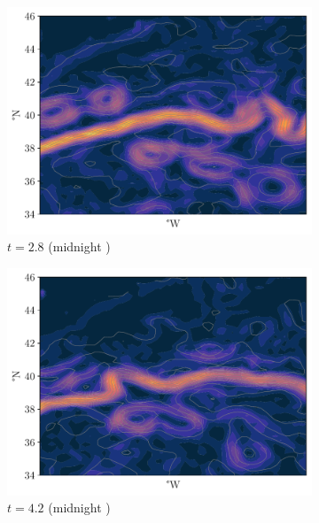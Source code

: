 \begin{figure}
\begin{center}
\begin{subfigure}{0.49\textwidth}
			\includegraphics[width=\textwidth]{chp06_applications/figures/gulf_stream_motivation/streamlines_2.pdf}
			\caption{\(t = 2.8\) (midnight )}
		\end{subfigure}
		\begin{subfigure}{0.49\textwidth}
			\includegraphics[width=\textwidth]{chp06_applications/figures/gulf_stream_motivation/streamlines_3.pdf}
			\caption{\(t = 4.2\) (midnight )}
		\end{subfigure}
		\begin{subfigure}{0.49\textwidth}

\end{subfigure}
\end{center}
\end{figure}

